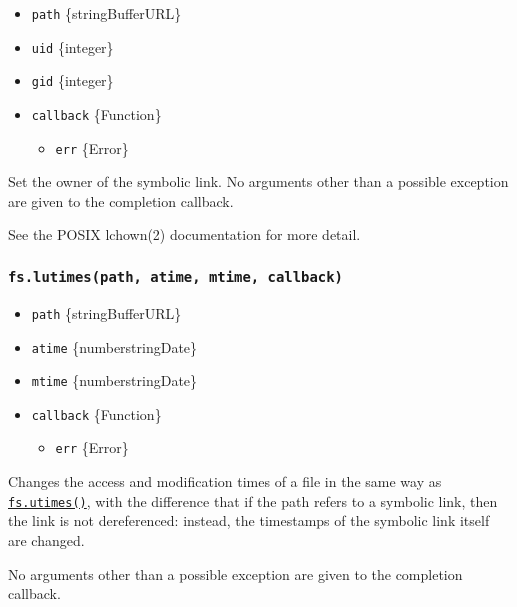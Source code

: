 \begin{itemize}
\tightlist
\item
  \texttt{path} \{string\textbar Buffer\textbar URL\}
\item
  \texttt{uid} \{integer\}
\item
  \texttt{gid} \{integer\}
\item
  \texttt{callback} \{Function\}

  \begin{itemize}
  \tightlist
  \item
    \texttt{err} \{Error\}
  \end{itemize}
\end{itemize}

Set the owner of the symbolic link. No arguments other than a possible
exception are given to the completion callback.

See the POSIX lchown(2) documentation for more detail.

\subsubsection{\texorpdfstring{\texttt{fs.lutimes(path,\ atime,\ mtime,\ callback)}}{fs.lutimes(path, atime, mtime, callback)}}\label{fs.lutimespath-atime-mtime-callback}

\begin{itemize}
\tightlist
\item
  \texttt{path} \{string\textbar Buffer\textbar URL\}
\item
  \texttt{atime} \{number\textbar string\textbar Date\}
\item
  \texttt{mtime} \{number\textbar string\textbar Date\}
\item
  \texttt{callback} \{Function\}

  \begin{itemize}
  \tightlist
  \item
    \texttt{err} \{Error\}
  \end{itemize}
\end{itemize}

Changes the access and modification times of a file in the same way as
\hyperref[fsutimespath-atime-mtime-callback]{\texttt{fs.utimes()}}, with
the difference that if the path refers to a symbolic link, then the link
is not dereferenced: instead, the timestamps of the symbolic link itself
are changed.

No arguments other than a possible exception are given to the completion
callback.

